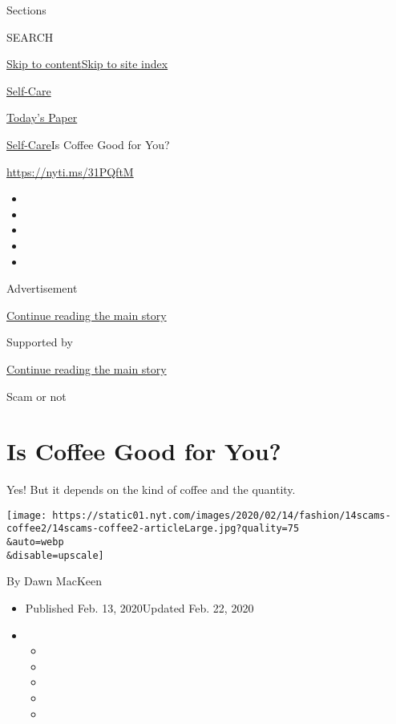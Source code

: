 Sections

SEARCH

\protect\hyperlink{site-content}{Skip to
content}\protect\hyperlink{site-index}{Skip to site index}

\href{https://www.nytimes.com/section/style/self-care/}{Self-Care}

\href{https://myaccount.nytimes.com/auth/login?response_type=cookie\&client_id=vi}{}

\href{https://www.nytimes.com/section/todayspaper}{Today's Paper}

\href{/section/style/self-care/}{Self-Care}\textbar{}Is Coffee Good for
You?

\url{https://nyti.ms/31PQftM}

\begin{itemize}
\item
\item
\item
\item
\item
\end{itemize}

Advertisement

\protect\hyperlink{after-top}{Continue reading the main story}

Supported by

\protect\hyperlink{after-sponsor}{Continue reading the main story}

Scam or not

\hypertarget{is-coffee-good-for-you}{%
\section{Is Coffee Good for You?}\label{is-coffee-good-for-you}}

Yes! But it depends on the kind of coffee and the quantity.

\texttt{[image: https://static01.nyt.com/images/2020/02/14/fashion/14scams-coffee2/14scams-coffee2-articleLarge.jpg?quality=75\\\&auto=webp\\\&disable=upscale]}

By Dawn MacKeen

\begin{itemize}
\item
  Published Feb. 13, 2020Updated Feb. 22, 2020
\item
  \begin{itemize}
  \item
  \item
  \item
  \item
  \item
  \end{itemize}
\end{itemize}


